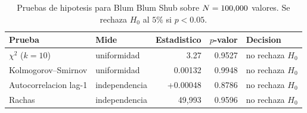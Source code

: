 \begin{table}[htbp]\centering
\caption{Pruebas de hipotesis para Blum Blum Shub sobre $N=100{,}000$ valores. Se rechaza $H_0$ al $5\%$ si $p<0.05$.}
\label{tab:pruebasBBS}
\small
\begin{tabular}{l|l|r|r|l}
\toprule
Prueba & Mide & Estadistico & $p$-valor & Decision \\
\midrule
$\chi^2$ ($k=10$) & uniformidad & 3.27 & 0.9527 & no rechaza $H_0$ \\
Kolmogorov--Smirnov & uniformidad & 0.00132 & 0.9948 & no rechaza $H_0$ \\
Autocorrelacion lag-1 & independencia & +0.00048 & 0.8786 & no rechaza $H_0$ \\
Rachas & independencia & 49{,}993 & 0.9596 & no rechaza $H_0$ \\
\bottomrule
\end{tabular}
\end{table}
